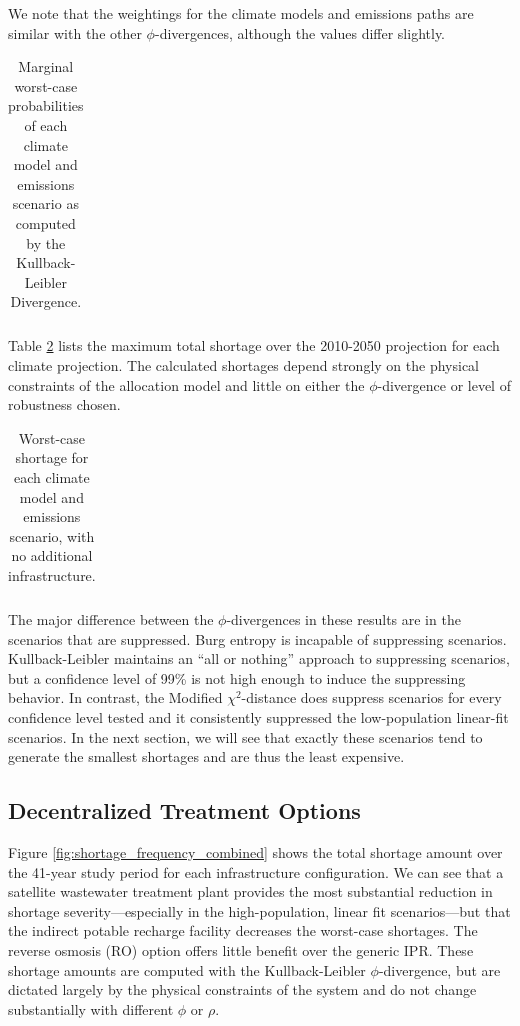 \documentclass[11pt]{article}
\theoremstyle{plain}
\theoremstyle{definition}
\theoremstyle{remark}
\begin{document}
We note that the weightings for the climate models and emissions paths are similar with the other $\phi$-divergences, although the values differ slightly.

\begin{table}
	\centering
	\begin{tabular}{l|cccc|c}
		
	\end{tabular}
	\caption{
		Marginal worst-case probabilities of each climate model and emissions scenario as computed by the Kullback-Leibler Divergence.
	}
	\label{tb:pworst_model_emission_kl}
\end{table}

Table \ref{tb:shortage_model_emission_kl} lists the maximum total shortage over the 2010-2050 projection for each climate projection.
The calculated shortages depend strongly on the physical constraints of the allocation model and little on either the $\phi$-divergence or level of robustness chosen.

\begin{table}
	\centering
	\begin{tabular}{l|cccc|c}
		
	\end{tabular}
	\caption{
		Worst-case shortage for each climate model and emissions scenario, with no additional infrastructure.
	}
	\label{tb:shortage_model_emission_kl}
\end{table}

The major difference between the $\phi$-divergences in these results are in the scenarios that are suppressed.
Burg entropy is incapable of suppressing scenarios.
Kullback-Leibler maintains an ``all or nothing'' approach to suppressing scenarios, but a confidence level of 99\% is not high enough to induce the suppressing behavior.
In contrast, the Modified $\chi^2$-distance does suppress scenarios for every confidence level tested and it consistently suppressed the low-population linear-fit scenarios.
In the next section, we will see that exactly these scenarios tend to generate the smallest shortages and are thus the least expensive.


\subsection{Decentralized Treatment Options}

Figure \ref{fig:shortage_frequency_combined} shows the total shortage amount over the 41-year study period for each infrastructure configuration.
We can see that a satellite wastewater treatment plant provides the most substantial reduction in shortage severity---especially in the high-population, linear fit scenarios---but that the indirect potable recharge facility decreases the worst-case shortages.
The reverse osmosis (RO) option offers little benefit over the generic IPR.
These shortage amounts are computed with the Kullback-Leibler $\phi$-divergence, but are dictated largely by the physical constraints of the system and do not change substantially with different $\phi$ or $\rho$.
\end{document}
